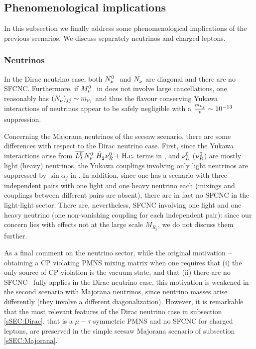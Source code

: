 \documentclass[12pt,a4paper]{article}
\begin{document}
\subsection{Phenomenological implications\label{sSEC:Pheno}}
In this subsection we finally address some phenomenological implications of the previous scenarios. We discuss separately neutrinos and charged leptons.

\subsubsection{Neutrinos\label{ssSEC:Neutrinos}}
In the Dirac neutrino case, both $\wNN$ and $\mNN$ are diagonal and there are no SFCNC. Furthermore, if $\wMN$ in  does not involve large cancellations, one reasonably has $(\mNN)_{jj}\sim m_{\nu_j}$ and thus the flavour conserving Yukawa interactions of neutrinos appear to be safely negligible with a $\frac{m_{\nu_j}}{v_{}}\sim 10^{-13}$ suppression.

Concerning the Majorana neutrinos of the seesaw scenario, there are some differences with respect to the Dirac neutrino case. First, since the Yukawa interactions arise from $\wLLb\wNN\HSDC{2}\wNR+\Hc$ terms in , and $\nu_L^0$ ($\nu_R^0$) are mostly light (heavy) neutrinos, the Yukawa couplings involving only light neutrinos are suppressed by $\sin\alpha_j$ in . In addition, since one has a scenario with three independent pairs with one light and one heavy neutrino each (mixings and couplings between different pairs are absent), there are in fact no SFCNC in the light-light sector. There are, nevertheless, SFCNC involving one light and one heavy neutrino (one non-vanishing coupling for each independent pair): since our concern lies with effects not at the large scale $M_{R_j}$, we do not discuss them further.

As a final comment on the neutrino sector, while the original motivation --obtaining a CP violating PMNS mixing matrix when one requires that (i) the only source of CP violation is the vacuum state, and that (ii) there are no SFCNC-- fully applies in the Dirac neutrino case, this motivation is weakened in the second scenario with Majorana neutrinos, since neutrino masses arise differently (they involve a different diagonalization). However, it is remarkable that the most relevant features of the Dirac neutrino case in subsection \ref{sSEC:Dirac}, that is a $\mu-\tau$ symmetric PMNS and no SFCNC for charged leptons, are preserved in the simple seesaw Majorana scenario of subsection \ref{sSEC:Majorana}.
\end{document}
